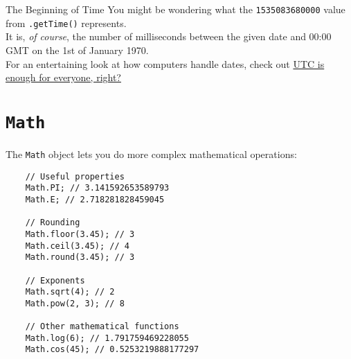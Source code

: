 \begin{infobox}{The Beginning of Time}
    You might be wondering what the \texttt{1535083680000} value from \texttt{.getTime()} represents.
    \\

    It is, \textit{of course}, the number of milliseconds between the given date and 00:00 GMT on the 1st of January 1970.
    \\

    For an entertaining look at how computers handle dates, check out \href{https://zachholman.com/talk/utc-is-enough-for-everyone-right}{UTC is enough for everyone, right?}
\end{infobox}

\pagebreak

\section{\texttt{Math}}

The \texttt{Math} object lets you do more complex mathematical operations:

\begin{verbatim}
    // Useful properties
    Math.PI; // 3.141592653589793
    Math.E; // 2.718281828459045

    // Rounding
    Math.floor(3.45); // 3
    Math.ceil(3.45); // 4
    Math.round(3.45); // 3

    // Exponents
    Math.sqrt(4); // 2
    Math.pow(2, 3); // 8

    // Other mathematical functions
    Math.log(6); // 1.791759469228055
    Math.cos(45); // 0.5253219888177297
\end{verbatim}

\pagebreak

